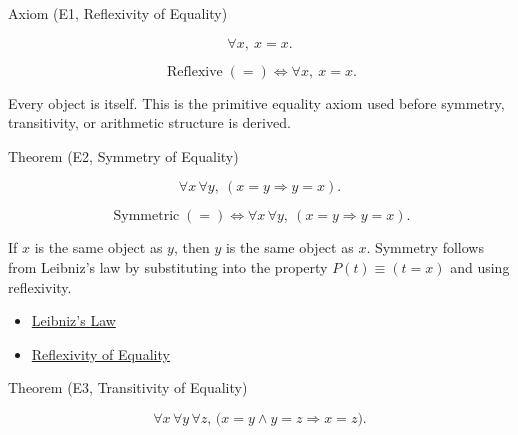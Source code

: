 \begin{axiombox}{Axiom (E1, Reflexivity of Equality)}
\begin{axiom}
\label{ax:equality-reflexivity}
\[
\forall x,\ x=x.
\]
\end{axiom}
\end{axiombox}

\begin{remark*}
\[
\operatorname{Reflexive}(=)
\Longleftrightarrow
\forall x,\ x=x.
\]
\end{remark*}

\begin{remark*}[Interpretation]
Every object is itself. This is the primitive equality axiom used before
symmetry, transitivity, or arithmetic structure is derived.
\end{remark*}

\NoLocalDependencies

\begin{theorembox}{Theorem (E2, Symmetry of Equality)}
\begin{theorem}
\label{thm:equality-symmetry}
\[
\forall x\,\forall y,\ (x=y \Longrightarrow y=x).
\]
\end{theorem}
\end{theorembox}

\begin{remark*}
\[
\operatorname{Symmetric}(=)
\Longleftrightarrow
\forall x\,\forall y,\ (x=y \Longrightarrow y=x).
\]
\end{remark*}

\begin{remark*}[Interpretation]
If $x$ is the same object as $y$, then $y$ is the same object as $x$.
Symmetry follows from Leibniz's law by substituting into the property
$P(t) \equiv (t=x)$ and using reflexivity.
\end{remark*}

\begin{dependencies}
\begin{itemize}
  \item \hyperref[ax:leibniz-law]{Leibniz's Law}
  \item \hyperref[ax:equality-reflexivity]{Reflexivity of Equality}
\end{itemize}
\end{dependencies}

\begin{theorembox}{Theorem (E3, Transitivity of Equality)}
\begin{theorem}
\label{thm:equality-transitivity}
\[
\forall x\,\forall y\,\forall z,\,
\bigl(x=y \land y=z \Longrightarrow x=z\bigr).
\]
\end{theorem}
\end{theorembox}

